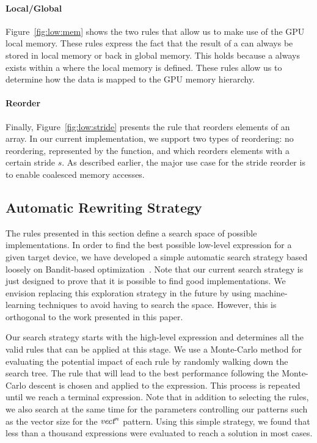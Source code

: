 \paragraph{Local/Global}
Figure~\ref{fig:low:mem} shows the two rules that allow us to make use of the GPU local memory.
These rules express the fact that the result of a  can always be stored in local memory or back in global memory.
This holds because a  always exists within a  where the local memory is defined.
These rules allow us to determine how the data is mapped to the GPU memory hierarchy.

\paragraph{Reorder}
Finally, Figure~\ref{fig:low:stride} presents the rule that reorders elements of an array.
In our current implementation, we support two types of reordering:
no reordering, represented by the  function, and  which reorders elements with a certain stride $s$.
As described earlier, the major use case for the stride reorder is to enable coalesced memory accesses.


\subsection{Automatic Rewriting Strategy}
\label{sec:search}

The rules presented in this section define a search space of possible implementations.
In order to find the best possible low-level expression for a given target device, we have developed a simple automatic search strategy based loosely on Bandit-based optimization~\cite{demesmay09bandit}.
Note that our current search strategy is just designed to prove that it is possible to find good implementations.
We envision replacing this exploration strategy in the future by using machine-learning techniques to avoid having to search the space.
However, this is orthogonal to the work presented in this paper.

Our search strategy starts with the high-level expression and determines all the valid rules that can be applied at this stage.
We use a Monte-Carlo method for evaluating the potential impact of each rule by randomly walking down the search tree.
The rule that will lead to the best performance following the Monte-Carlo descent is chosen and applied to the expression.
This process is repeated until we reach a terminal expression.
Note that in addition to selecting the rules, we also search at the same time for the parameters controlling our patterns such as the vector size for the $\textit{vect}^n$ pattern.
Using this simple strategy, we found that less than a thousand expressions were evaluated to reach a solution in most cases.


